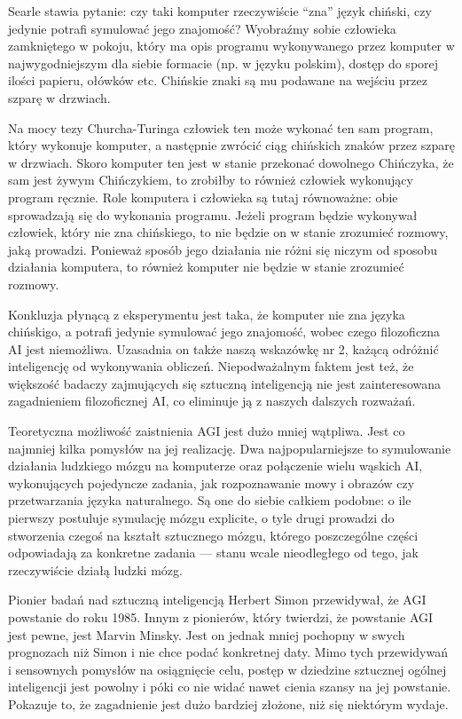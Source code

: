 \documentclass[10pt,a4paper]{article}
\begin{document}
	\par Searle stawia pytanie: czy taki komputer rzeczywiście ``zna'' język chiński, czy jedynie potrafi symulować jego znajomość? Wyobraźmy sobie człowieka zamkniętego w pokoju, który ma opis programu wykonywanego przez komputer w najwygodniejszym dla siebie formacie (np. w języku polskim), dostęp do sporej ilości papieru, ołówków etc. Chińskie znaki są mu podawane na wejściu przez szparę w drzwiach.
	\par Na mocy tezy Churcha-Turinga człowiek ten może wykonać ten sam program, który wykonuje komputer, a następnie zwrócić ciąg chińskich znaków przez szparę w drzwiach. Skoro komputer ten jest w stanie przekonać dowolnego Chińczyka, że sam jest żywym Chińczykiem, to zrobiłby to również człowiek wykonujący program ręcznie. Role komputera i człowieka są tutaj równoważne: obie sprowadzają się do wykonania programu. Jeżeli program będzie wykonywał człowiek, który nie zna chińskiego, to nie będzie on w stanie zrozumieć rozmowy, jaką prowadzi. Ponieważ sposób jego działania nie różni się niczym od sposobu działania komputera, to również komputer nie będzie w stanie zrozumieć rozmowy.
	\par Konkluzja płynącą z eksperymentu jest taka, że komputer nie zna języka chińskigo, a potrafi jedynie symulować jego znajomość, wobec czego filozoficzna AI jest niemożliwa. Uzasadnia on także naszą wskazówkę nr 2, każącą odróżnić inteligencję od wykonywania obliczeń. Niepodważalnym faktem jest też, że większość badaczy zajmujących się sztuczną inteligencją nie jest zainteresowana zagadnieniem filozoficznej AI, co eliminuje ją z naszych dalszych rozważań.
	\par Teoretyczna możliwość zaistnienia AGI jest dużo mniej wątpliwa. Jest co najmniej kilka pomysłów na jej realizację. Dwa najpopularniejsze to symulowanie działania ludzkiego mózgu na komputerze oraz połączenie wielu wąskich AI, wykonujących pojedyncze zadania, jak rozpoznawanie mowy i obrazów czy przetwarzania języka naturalnego. Są one do siebie całkiem podobne: o ile pierwszy postuluje symulację mózgu explicite, o tyle drugi prowadzi do stworzenia czegoś na kształt sztucznego mózgu, którego poszczególne części odpowiadają za konkretne zadania — stanu wcale nieodległego od tego, jak rzeczywiście działą ludzki mózg.
	\par Pionier badań nad sztuczną inteligencją Herbert Simon przewidywał, że AGI powstanie do roku 1985. Innym z pionierów, który twierdzi, że powstanie AGI jest pewne, jest Marvin Minsky. Jest on jednak mniej pochopny w swych prognozach niż Simon i nie chce podać konkretnej daty. Mimo tych przewidywań i sensownych pomysłów na osiągnięcie celu, postęp w dziedzine sztucznej ogólnej inteligencji jest powolny i póki co nie widać nawet cienia szansy na jej powstanie. Pokazuje to, że zagadnienie jest dużo bardziej złożone, niż się niektórym wydaje.
\end{document}
